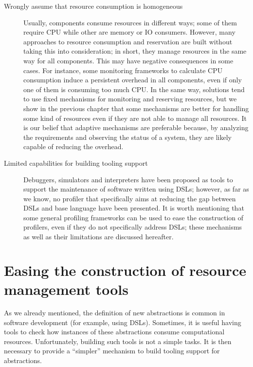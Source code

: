 \begin{description}
\item[Wrongly assume that resource consumption is homogeneous]
Usually, components consume resources in different ways; some of them require CPU while other are memory or IO consumers.
However, many approaches to resource consumption and reservation are built without taking this into consideration; in short, they manage resources in the same way for all components.
This may have negative consequences in some cases.
For instance, some monitoring frameworks to calculate CPU consumption induce a persistent overhead in all components, even if only one of them is consuming too much CPU.
In the same way, solutions tend to use fixed mechanisms for monitoring and reserving resources, but we show in the previous chapter that some mechanisms are better for handling some kind of resources even if they are not able to manage all resources. 
It is our belief that adaptive mechanisms are preferable because, by analyzing the requirements and observing the status of a system, they are likely capable of reducing the overhead.

\item[Limited capabilities for building tooling support] Debuggers, simulators and interpreters have been proposed as tools to support the maintenance of software written using DSLs; however, as far as we know, no profiler that specifically aims at reducing the gap between DSLs and base language have been presented.
It is worth mentioning that some general profiling frameworks can be used to ease the construction of profilers, even if they do not specifically address DSLs; these mechanisms as well as their limitations are discussed hereafter.

\end{description}

\section{Easing the construction of resource management tools} \label{sec:easy-tools-contruction}

As we already mentioned, the definition of new abstractions is common in software development (for example, using DSLs).
Sometimes, it is useful having tools to check how instances of these abstractions consume computational resources.
Unfortunately, building such tools is not a simple tasks.
It is then necessary to provide a ``simpler'' mechanism to build tooling support for abstractions.

